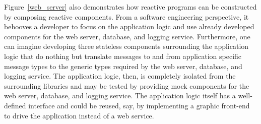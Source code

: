 Figure~\ref{web_server} also demonstrates how reactive programs can be constructed by composing reactive components.
From a software engineering perspective, it behooves a developer to focus on the application logic and use already developed components for the web server, database, and logging service.
Furthermore, one can imagine developing three stateless components surrounding the application logic that do nothing but translate messages to and from application specific message types to the generic types required by the web server, database, and logging service.
The application logic, then, is completely isolated from the surrounding libraries and may be tested by providing mock components for the web server, database, and logging service.
The application logic itself has a well-defined interface and could be reused, say, by implementing a graphic front-end to drive the application instead of a web service.



